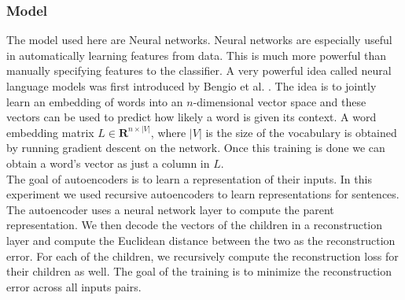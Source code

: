 \documentclass[conference]{IEEEtran}
\begin{document}
\subsubsection{Model}
The model used here are Neural networks. Neural networks are especially useful in automatically learning features from data. This is much more powerful than manually specifying features to the classifier. A very powerful idea called neural language models was first introduced by Bengio et al. \cite{bengio}. The idea is to jointly learn an embedding of words into an $n$-dimensional vector space and these vectors can be used to predict how likely a word is given its context. A word embedding matrix $L \in \mathbf{R}^{n \times |V|}$, where $|V|$ is the size of the vocabulary is obtained by running gradient descent on the network. Once this training is done we can obtain a word's vector as just a column in $L$.\\
The goal of autoencoders is to learn a representation of their inputs. In this experiment we used recursive autoencoders to learn representations for sentences. The autoencoder uses a neural network layer to compute the parent representation. We then decode the vectors of the children in a reconstruction layer and compute the Euclidean distance between the two as the reconstruction error. For each of the children, we recursively compute the reconstruction loss for their children as well. The goal of the training is to minimize the reconstruction error across all inputs pairs. 
\end{document}
